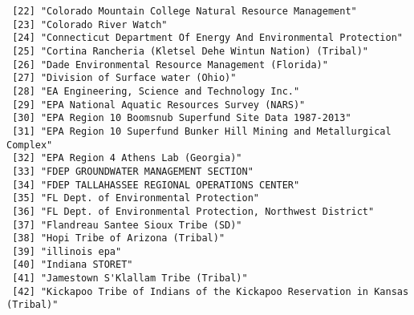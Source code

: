\documentclass[
  12pt,
]{article}
\begin{document}
\begin{verbatim}
 [22] "Colorado Mountain College Natural Resource Management"                                                                
 [23] "Colorado River Watch"                                                                                                 
 [24] "Connecticut Department Of Energy And Environmental Protection"                                                        
 [25] "Cortina Rancheria (Kletsel Dehe Wintun Nation) (Tribal)"                                                              
 [26] "Dade Environmental Resource Management (Florida)"                                                                     
 [27] "Division of Surface water (Ohio)"                                                                                     
 [28] "EA Engineering, Science and Technology Inc."                                                                          
 [29] "EPA National Aquatic Resources Survey (NARS)"                                                                         
 [30] "EPA Region 10 Boomsnub Superfund Site Data 1987-2013"                                                                 
 [31] "EPA Region 10 Superfund Bunker Hill Mining and Metallurgical Complex"                                                 
 [32] "EPA Region 4 Athens Lab (Georgia)"                                                                                    
 [33] "FDEP GROUNDWATER MANAGEMENT SECTION"                                                                                  
 [34] "FDEP TALLAHASSEE REGIONAL OPERATIONS CENTER"                                                                          
 [35] "FL Dept. of Environmental Protection"                                                                                 
 [36] "FL Dept. of Environmental Protection, Northwest District"                                                             
 [37] "Flandreau Santee Sioux Tribe (SD)"                                                                                    
 [38] "Hopi Tribe of Arizona (Tribal)"                                                                                       
 [39] "illinois epa"                                                                                                         
 [40] "Indiana STORET"                                                                                                       
 [41] "Jamestown S'Klallam Tribe (Tribal)"                                                                                   
 [42] "Kickapoo Tribe of Indians of the Kickapoo Reservation in Kansas (Tribal)"                                             

\end{verbatim}
\end{document}
